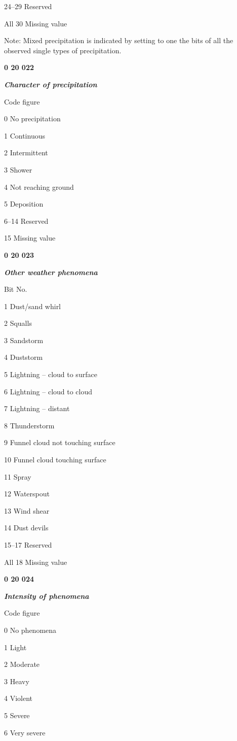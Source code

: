 24--29 Reserved

All 30 Missing value

Note: Mixed precipitation is indicated by setting to one the bits of all the observed single types of precipitation.

\textbf{0 20 022}

\emph{\textbf{Character of precipitation}}

Code figure

0 No precipitation

1 Continuous

2 Intermittent

3 Shower

4 Not reaching ground

5 Deposition

6--14 Reserved

15 Missing value

\textbf{0 20 023}

\emph{\textbf{Other weather phenomena}}

Bit No.

1 Dust/sand whirl

2 Squalls

3 Sandstorm

4 Duststorm

5 Lightning -- cloud to surface

6 Lightning -- cloud to cloud

7 Lightning -- distant

8 Thunderstorm

9 Funnel cloud not touching surface

10 Funnel cloud touching surface

11 Spray

12 Waterspout

13 Wind shear

14 Dust devils

15--17 Reserved

All 18 Missing value

\textbf{0 20 024}

\emph{\textbf{Intensity of phenomena}}

Code figure

0 No phenomena

1 Light

2 Moderate

3 Heavy

4 Violent

5 Severe

6 Very severe

